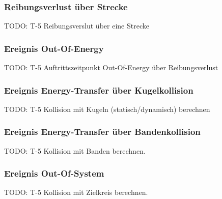 \subsubsection{Reibungsverlust über Strecke}
TODO: T-5 Reibungsverslut über eine Strecke

\subsubsection{Ereignis Out-Of-Energy}
TODO: T-5 Auftrittszeitpunkt Out-Of-Energy über Reibungsverlust

\subsubsection{Ereignis Energy-Transfer über Kugelkollision}
TODO: T-5 Kollision mit Kugeln (statisch/dynamisch) berechnen

\subsubsection{Ereignis Energy-Transfer über Bandenkollision}
TODO: T-5 Kollision mit Banden berechnen.

\subsubsection{Ereignis Out-Of-System}
TODO: T-5 Kollision mit Zielkreis berechnen.
